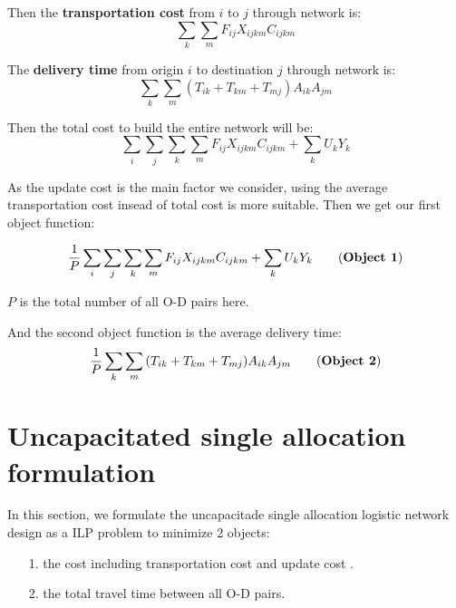 \documentclass{llncs}
\begin{document}
	Then the \textbf{transportation cost} from $i$ to $j$ through network is:
	\begin{equation}
		\sum_{k}\sum_{m}F_{ij}  X_{ijkm} C_{ijkm}
	\end{equation}
	
	The \textbf{delivery time} from origin $i$ to destination $j$ through network is:
	\begin{equation}
	\sum_{k}\sum_{m}{(T_{ik}+ T_{km}+ T_{mj} ) A_{ik} A_{jm}}
	\end{equation}
	
	Then the total cost to build the entire network will be:
	\begin{equation}
		\sum_{i}\sum_{j}\sum_{k}\sum_{m}F_{ij}  X_{ijkm} C_{ijkm} + \sum_{k}U_k Y_{k}
	\end{equation}
	
	As the update cost is the main factor we consider, using the average transportation cost insead of total cost is more suitable. Then we get our first object function:
	
	\begin{equation}
		\frac{1}{P}\sum_{i}\sum_{j}\sum_{k}\sum_{m}F_{ij}  X_{ijkm} C_{ijkm} + \sum_{k}U_k Y_{k} \tag{\textbf{Object 1}}
	\end{equation}
	
	$P$ is the total number of all O-D pairs here.
	
	And the second object function is the average delivery time:
		\begin{equation}
		\frac{1}{P} \sum_{k}\sum_{m}{(T_{ik}+ T_{km}+ T_{mj} ) A_{ik} A_{jm}} \tag{\textbf{Object 2}}
	\end{equation}
	
\section{Uncapacitated single allocation formulation}
	In this section, we formulate the uncapacitade single allocation logistic network design as a ILP problem to minimize 2 objects:
	\begin{itemize}
		\item[1.] the cost including transportation cost and update cost .
		\item[2.] the total travel time between all O-D pairs.
	\end{itemize}
	
\end{document}
